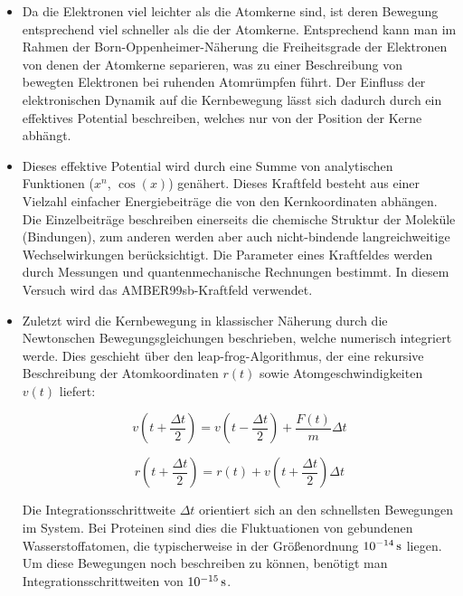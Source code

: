 \documentclass[a4paper,12pt]{article}
\begin{document}
\begin{itemize}
    \item Da die Elektronen viel leichter als die Atomkerne sind, ist deren Bewegung
          entsprechend viel schneller als die der Atomkerne. Entsprechend kann man im Rahmen der
          Born-Oppenheimer-Näherung die Freiheitsgrade der Elektronen von denen der
          Atomkerne separieren, was zu einer Beschreibung von bewegten Elektronen bei
          ruhenden Atomrümpfen führt. Der Einfluss der elektronischen Dynamik auf die
          Kernbewegung lässt sich dadurch durch ein
          effektives Potential beschreiben, welches nur von der Position der Kerne abhängt.
    \item Dieses effektive Potential wird durch eine Summe von analytischen Funktionen
          ($x^n$, $\cos(x)$) genähert. Dieses Kraftfeld
          besteht aus einer Vielzahl einfacher Energiebeiträge die von den Kernkoordinaten
          abhängen. Die Einzelbeiträge beschreiben einerseits die chemische Struktur der
          Moleküle (Bindungen), zum anderen werden aber auch nicht-bindende
          langreichweitige Wechselwirkungen berücksichtigt. Die Parameter eines Kraftfeldes
          werden durch Messungen und quantenmechanische Rechnungen bestimmt.
          In diesem Versuch wird das AMBER99sb-Kraftfeld verwendet.
    \item Zuletzt wird die  Kernbewegung in klassischer Näherung durch die
          Newtonschen Bewegungsgleichungen beschrieben, welche numerisch integriert werde.
          Dies geschieht über
          den leap-frog-Algorithmus, der eine rekursive Beschreibung der
          Atomkoordinaten $r(t)$ sowie Atomgeschwindigkeiten $v(t)$ liefert:

          \[ v\left(t+\frac{\Delta t}{2}\right)=v\left(t-\frac{\Delta t}{2}\right)+\frac{F(t)}{m}\Delta t \]
          
          \[ r\left(t+\frac{\Delta t}{2}\right)=r(t)+v\left(t+\frac{\Delta t}{2}\right)\Delta t \]

          Die Integrationsschrittweite $\Delta t$ orientiert sich an den schnellsten
          Bewegungen im System. Bei Proteinen sind dies die Fluktuationen von gebundenen
          Wasserstoffatomen, die typischerweise in der Größenordnung $10^{-14}\,{\rm s}$
          liegen. Um diese Bewegungen noch beschreiben zu können, benötigt man
          Integrationsschrittweiten von $10^{-15}\,{\rm s}$.
\end{itemize}
\end{document}
